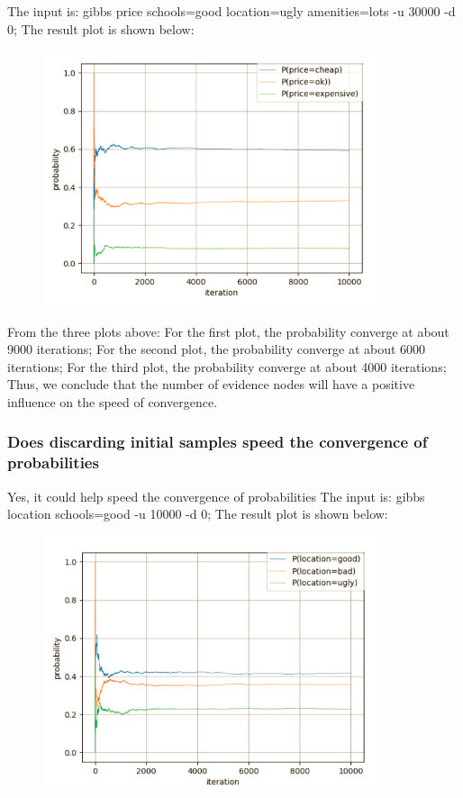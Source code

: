\documentclass[11pt, a4paper]{article}
\begin{document}
The input is: gibbs price schools=good location=ugly amenities=lots -u 30000 -d 0; The result plot is shown below: 

\begin{figure}[htbp]
	
	\centering 
	\includegraphics[width=10cm]{gs_6}
	
	\label{fig:gb6}
	
\end{figure}


From the three plots above:
For the first plot, the probability converge at about 9000 iterations;
For the second plot, the probability converge at about 6000 iterations;
For the third plot, the probability converge at about 4000 iterations;
Thus, we conclude that the number of evidence nodes will have a positive influence on the speed of convergence.


\subsubsection{Does discarding initial samples speed the convergence of probabilities}


Yes, it could help speed the convergence of probabilities
The input is: gibbs location schools=good -u 10000 -d 0; The result plot is shown below:

\begin{figure}[htbp]
	
	\centering 
	\includegraphics[width=10cm]{gs_7}
	
	\label{fig:gb7}
	
\end{figure}
\end{document}
